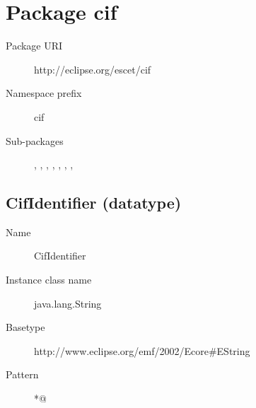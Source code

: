 

\section{Package cif}\label{cifpkg:cif}
\pkgdocucif

\begin{description}
\item[Package URI] http://eclipse.org/escet/cif
\item[Namespace prefix] cif
\item[Sub-packages] , , , , , , , 
\end{description}

\subsection{CifIdentifier (datatype)}\label{cifclass:CifIdentifier}
\dtypedocuCifIdentifier

\begin{description}
\item[Name] CifIdentifier
\item[Instance class name] java.lang.String
\item[Basetype] http://www.eclipse.org/emf/2002/Ecore\#EString
\item[Pattern] \verb@[A-Za-z_][A-Za-z0-9_]*@
\end{description}


